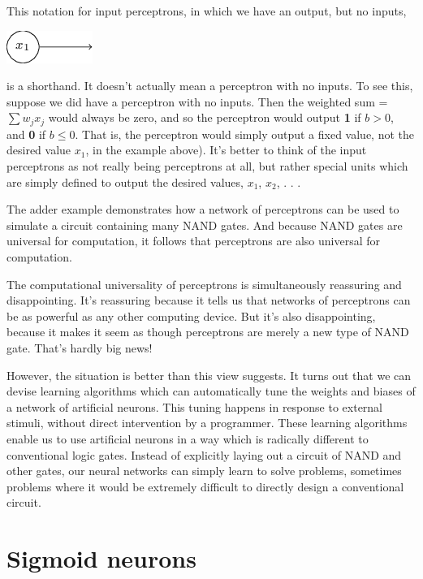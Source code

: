 \documentclass[a4paper,12pt]{report}%
\begin{document}
This notation for input perceptrons, in which we have an output, but no inputs,
\begin{center} \includegraphics[width=0.2\linewidth]{images/tikz7.png} \end{center}

is a shorthand. It doesn't actually mean a perceptron with no inputs. To see this, suppose we did have a perceptron with no inputs. Then the weighted sum = $\sum w_{j} x_{j}$ would always be zero, and so the perceptron would output \textbf{1} if $b > 0$, and \textbf{0} if $b \le 0$. That is, the perceptron would simply output a fixed value, not the desired value $x_{1}$, in the example above). It's better to think of the input perceptrons as not really being perceptrons at all, but rather special units which are simply defined to output the desired values, $x_{1}$, $x_{2}$, . . .

The adder example demonstrates how a network of perceptrons can be used to simulate a circuit containing many NAND gates. And because NAND gates are universal for computation, it follows that perceptrons are also universal for computation.

The computational universality of perceptrons is simultaneously reassuring and disappointing. It's reassuring because it tells us that networks of perceptrons can be as powerful as any other computing device. But it's also disappointing, because it makes it seem as though perceptrons are merely a new type of NAND gate. That's hardly big news!

However, the situation is better than this view suggests. It turns out that we can devise learning algorithms which can automatically tune the weights and biases of a network of artificial neurons. This tuning happens in response to external stimuli, without direct intervention by a programmer. These learning algorithms enable us to use artificial neurons in a way which is radically different to conventional logic gates. Instead of explicitly laying out a circuit of NAND and other gates, our neural networks can simply learn to solve problems, sometimes problems where it would be extremely difficult to directly design a conventional circuit.


\section{Sigmoid neurons}
\end{document}
